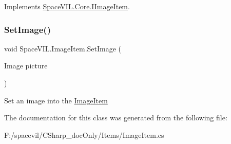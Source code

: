 Implements \mbox{\hyperlink{interface_space_v_i_l_1_1_core_1_1_i_image_item}{Space\+V\+I\+L.\+Core.\+I\+Image\+Item}}.

\mbox{\label{class_space_v_i_l_1_1_image_item_ae62563d3131e913b37293731fa535205}} 
\subsubsection{\texorpdfstring{Set\+Image()}{SetImage()}}
{\footnotesize\ttfamily void Space\+V\+I\+L.\+Image\+Item.\+Set\+Image (\begin{DoxyParamCaption}\item[{Image}]{picture }\end{DoxyParamCaption})}



Set an image into the \mbox{\hyperlink{class_space_v_i_l_1_1_image_item}{Image\+Item}} 



The documentation for this class was generated from the following file\+:\begin{DoxyCompactItemize}
\item 
F\+:/spacevil/\+C\+Sharp\+\_\+doc\+Only/\+Items/Image\+Item.\+cs\end{DoxyCompactItemize}
